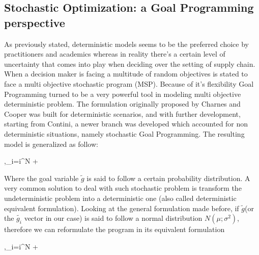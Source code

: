 \documentclass{article}
\begin{document}
  \subsection{Stochastic Optimization: a Goal Programming perspective}
  As previously stated, deterministic models seems to be the preferred choice by practitioners and academics whereas in reality there's a certain level of uncertainty that comes into play when deciding over the setting of supply chain. When a decision maker is facing a multitude of random objectives is stated to face a multi objective stochastic program (MSP). Because of it's flexibility Goal Programming turned to be a very powerful tool in modeling multi objective deterministic problem. The formulation originally proposed by Charnes and Cooper\cite{charnes_optimal_1955} was built for deterministic scenarios, and with further development, starting from Contini\cite{Contini1968}, a newer branch was developed which accounted for non deterministic situations, namely stochastic Goal Programming. The resulting model is generalized as follow:
\begin{mini!}
	{\tilde{\delta^+},\tilde{\delta^-}}{\sum_{i=i}^{N} +}{}{}
\end{mini!}
Where the goal variable $\tilde{g}$ is said to follow a certain probability distribution. A very common solution to deal with such stochastic problem is transform the undeterministic problem into a deterministic one (also called deterministic equivalent formulation). Looking at the general formulation made before, if $\tilde{g}$(or the $\tilde{g_i}$ vector in our case) is said to follow a normal distribution $N(\mu;\sigma^2)$, therefore we can reformulate the program in its equivalent formulation\cite{azimian_supply_2017} 
\begin{mini!}
	{\tilde{\delta^+},\tilde{\delta^-}}{\sum_{i=i}^{N} +}{}{}
\end{mini!}
\end{document}
